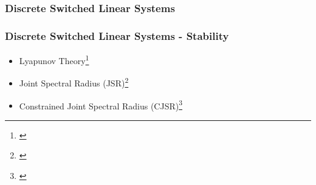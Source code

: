 \begin{frame}
    \frametitle{Discrete Switched Linear Systems}
    \begin{figure}[h]
        \centering
        \only<2>{}%
        \only<3>{}%
    \end{figure}
\end{frame}


\begin{frame}
    \frametitle{Discrete Switched Linear Systems - Stability}
    \begin{itemize}\setlength\itemsep{1em}
        \item Lyapunov Theory\footnote{\cite{Liberzon:2003, Linsenmayer:2021, Hertneck:2021}}
        \item Joint Spectral Radius (JSR)\footnote{\cite{Maggio:2020, Ogura:2013}}
        \item Constrained Joint Spectral Radius (CJSR)\footnote{\cite{Dai:2012}}
    \end{itemize}
\end{frame}


